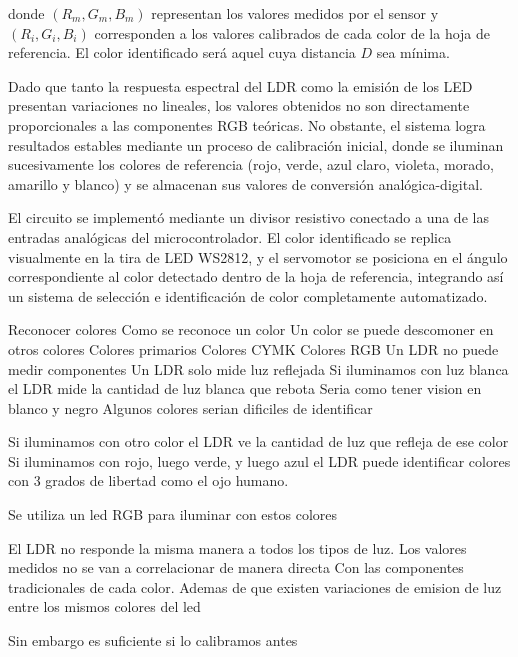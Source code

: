 donde $(R_m, G_m, B_m)$ representan los valores medidos por el sensor y $(R_i, G_i, B_i)$ corresponden a los valores calibrados de cada color de la hoja de referencia. El color identificado será aquel cuya distancia $D$ sea mínima.

\vspace{1em}

Dado que tanto la respuesta espectral del LDR como la emisión de los LED presentan variaciones no lineales, los valores obtenidos no son directamente proporcionales a las componentes RGB teóricas. No obstante, el sistema logra resultados estables mediante un proceso de calibración inicial, donde se iluminan sucesivamente los colores de referencia (rojo, verde, azul claro, violeta, morado, amarillo y blanco) y se almacenan sus valores de conversión analógica-digital.

\vspace{1em}

El circuito se implementó mediante un divisor resistivo conectado a una de las entradas analógicas del microcontrolador. El color identificado se replica visualmente en la tira de LED WS2812, y el servomotor se posiciona en el ángulo correspondiente al color detectado dentro de la hoja de referencia, integrando así un sistema de selección e identificación de color completamente automatizado.

\vspace{1em}

Reconocer colores
Como se reconoce un color
Un color se puede descomoner en otros colores
Colores primarios
Colores CYMK
Colores RGB
Un LDR no puede medir componentes
Un LDR solo mide luz reflejada
Si iluminamos con luz blanca el LDR mide la cantidad de luz blanca que rebota
Seria como tener vision en blanco y negro
Algunos colores serian dificiles de identificar

Si iluminamos con otro color el LDR ve la cantidad de luz que refleja de ese color
Si iluminamos con rojo, luego verde, y luego azul el LDR puede identificar 
colores con 3 grados de libertad como el ojo humano.

Se utiliza un led RGB para iluminar con estos colores

El LDR no responde la misma manera a todos los tipos de luz. 
Los valores medidos no se van a correlacionar de manera directa
Con las componentes tradicionales de cada color.
Ademas de que existen variaciones de emision de luz entre los mismos colores del led

Sin embargo es suficiente si lo calibramos antes

